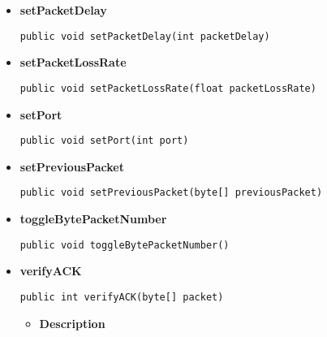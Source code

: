 {{{{{\begin{itemize}
{\begin{lstlisting}[frame=none]
public void setFilePath(java.lang.String filePath)\end{lstlisting} %
}%
\item{ 
\hypertarget{filetransferUDP.FileTransfer.setPacketDelay(int)}{{\bf  setPacketDelay}\\}
\begin{lstlisting}[frame=none]
public void setPacketDelay(int packetDelay)\end{lstlisting} %
}%
\item{ 
\hypertarget{filetransferUDP.FileTransfer.setPacketLossRate(float)}{{\bf  setPacketLossRate}\\}
\begin{lstlisting}[frame=none]
public void setPacketLossRate(float packetLossRate)\end{lstlisting} %
}%
\item{ 
\hypertarget{filetransferUDP.FileTransfer.setPort(int)}{{\bf  setPort}\\}
\begin{lstlisting}[frame=none]
public void setPort(int port)\end{lstlisting} %
}%
\item{ 
\hypertarget{filetransferUDP.FileTransfer.setPreviousPacket(byte[])}{{\bf  setPreviousPacket}\\}
\begin{lstlisting}[frame=none]
public void setPreviousPacket(byte[] previousPacket)\end{lstlisting} %
}%
\item{ 
\hypertarget{filetransferUDP.FileTransfer.toggleBytePacketNumber()}{{\bf  toggleBytePacketNumber}\\}
\begin{lstlisting}[frame=none]
public void toggleBytePacketNumber()\end{lstlisting} %
}%
\item{ 
\hypertarget{filetransferUDP.FileTransfer.verifyACK(byte[])}{{\bf  verifyACK}\\}
\begin{lstlisting}[frame=none]
public int verifyACK(byte[] packet)\end{lstlisting} %
\begin{itemize}
\item{
{\bf  Description}

}
\end{itemize}}
\end{itemize}}}}}}
